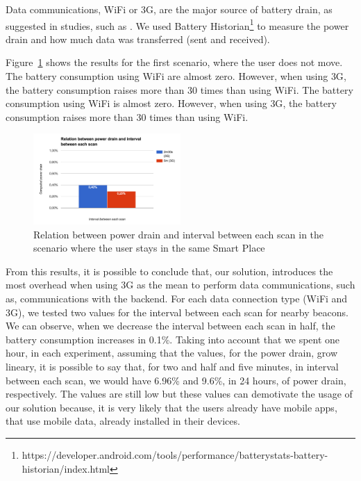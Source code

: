 Data communications, \gls{WiFi} or \gls{3G}, are the major source of battery drain, as suggested in studies, such as \cite{energy}.
We used Battery Historian\footnote{https://developer.android.com/tools/performance/batterystats-battery-historian/index.html} to measure the power drain and how much data was transferred (sent and received).

Figure~\ref{fig:results_battery_stopped} shows the results for the first scenario, where the user does not move.
The battery consumption using \gls{WiFi} are almost zero.
However, when using \gls{3G}, the battery consumption raises more than 30 times than using \gls{WiFi}.
The battery consumption using \gls{WiFi} is almost zero.
However, when using \gls{3G}, the battery consumption raises more than 30 times than using \gls{WiFi}.

\begin{figure}[!ht]
  \centering
    \includegraphics[width=0.5\textwidth, keepaspectratio]{figures/results_battery_stopped}
    \caption[Power drain when the user does not move]{Relation between power drain and interval between each scan in the scenario where the user stays in the same Smart Place}
    \label{fig:results_battery_stopped}
\end{figure}

From this results, it is possible to conclude that, our solution, introduces the most overhead when using \gls{3G} as the mean to perform data communications, such as, communications with the backend.
For each data connection type (\gls{WiFi} and \gls{3G}), we tested two values for the interval between each scan for nearby beacons.
We can observe, when we decrease the interval between each scan in half, the battery consumption increases in 0.1\%.
Taking into account that we spent one hour, in each experiment, assuming that the values, for the power drain, grow lineary, it is possible to say that, for two and half and five minutes, in interval between each scan, we would have 6.96\% and 9.6\%, in 24 hours, of power drain, respectively.
The values are still low but these values can demotivate the usage of our solution because, it is very likely that the users already have mobile apps, that use mobile data, already installed in their devices.

